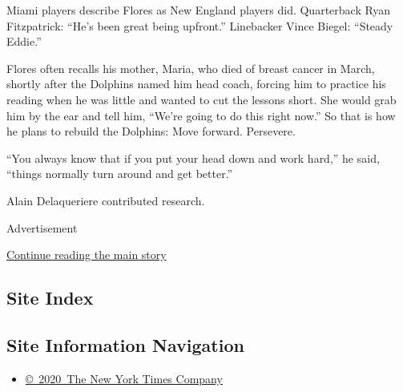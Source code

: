 Miami players describe Flores as New England players did. Quarterback
Ryan Fitzpatrick: ``He's been great being upfront.'' Linebacker Vince
Biegel: ``Steady Eddie.''

Flores often recalls his mother, Maria, who died of breast cancer in
March, shortly after the Dolphins named him head coach, forcing him to
practice his reading when he was little and wanted to cut the lessons
short. She would grab him by the ear and tell him, ``We're going to do
this right now.'' So that is how he plans to rebuild the Dolphins: Move
forward. Persevere.

``You always know that if you put your head down and work hard,'' he
said, ``things normally turn around and get better.''

Alain Delaqueriere contributed research.

Advertisement

\protect\hyperlink{after-bottom}{Continue reading the main story}

\hypertarget{site-index}{%
\subsection{Site Index}\label{site-index}}

\hypertarget{site-information-navigation}{%
\subsection{Site Information
Navigation}\label{site-information-navigation}}

\begin{itemize}
\tightlist
\item
  \href{https://help.nytimes3xbfgragh.onion/hc/en-us/articles/115014792127-Copyright-notice}{©~2020~The
  New York Times Company}
\end{itemize}

